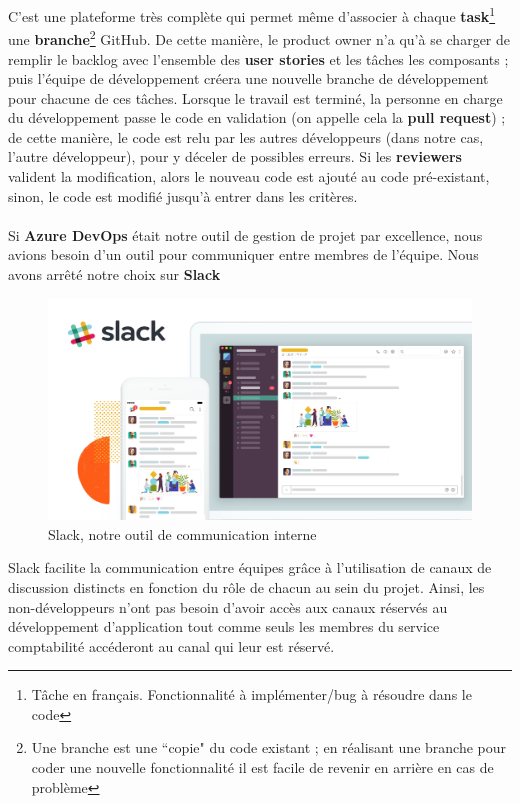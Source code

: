 C'est une plateforme très complète qui permet même d'associer à chaque \textbf{task}\footnote{Tâche en français. Fonctionnalité à implémenter/bug à résoudre dans le code} une \textbf{branche}\footnote{Une branche est une “copie" du code existant ; en réalisant une branche pour coder une nouvelle fonctionnalité il est facile de revenir en arrière en cas de problème} GitHub. De cette manière, le product owner n'a qu'à se charger de remplir le backlog avec l'ensemble des \textbf{user stories} et les tâches les composants ; puis l'équipe de développement créera une nouvelle branche de développement pour chacune de ces tâches. Lorsque le travail est terminé, la personne en charge du développement passe le code en validation (on appelle cela la \textbf{pull request}) ; de cette manière, le code est relu par les autres développeurs (dans notre cas, l'autre développeur), pour y déceler de possibles erreurs. Si les \textbf{reviewers} valident la modification, alors le nouveau code est ajouté au code pré-existant, sinon, le code est modifié jusqu'à entrer dans les critères.\\

\hfill \\
Si \textbf{Azure DevOps} était notre outil de gestion de projet par excellence, nous avions besoin d'un outil pour communiquer entre membres de l'équipe. Nous avons arrêté notre choix sur \textbf{Slack}\\

\begin{figure}[!h]
    \centering
    \includegraphics[scale=0.15]{img/slack.png}
    \caption{Slack, notre outil de communication interne}
    \label{fig:my_label}
\end{figure}

Slack facilite la communication entre équipes grâce à l'utilisation de canaux de discussion distincts en fonction du rôle de chacun au sein du projet. Ainsi, les non-développeurs n'ont pas besoin d'avoir accès aux canaux réservés au développement d'application tout comme seuls les membres du service comptabilité accéderont au canal qui leur est réservé.\\

